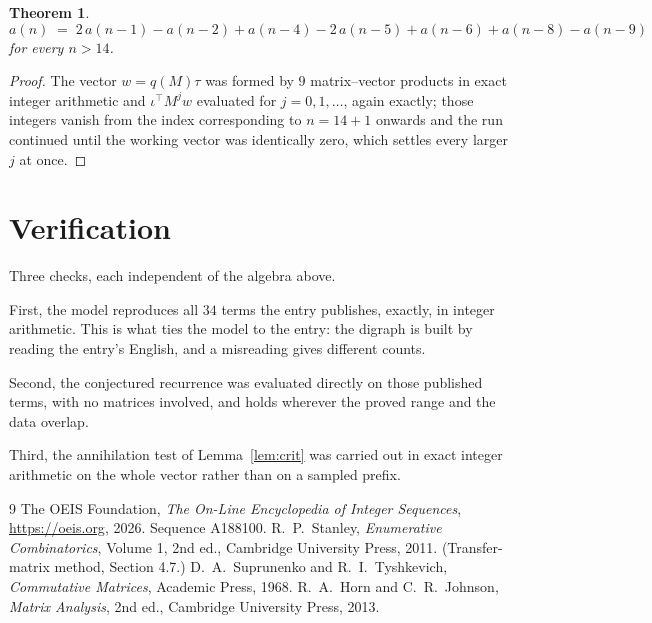 \documentclass[11pt,a4paper]{article}
\theoremstyle{plain}
\newtheorem{theorem}{Theorem}
\theoremstyle{definition}
\begin{document}
\begin{theorem}
\[
a(n)\;=\;2\,a(n-1) - a(n-2) + a(n-4) - 2\,a(n-5) + a(n-6) + a(n-8) - a(n-9)
\]
for every $n>14$.
\end{theorem}

\begin{proof}
The vector $w=q(M)\tau$ was formed by $9$ matrix--vector products in exact integer
arithmetic and $\iota^{\!\top}M^{j}w$ evaluated for $j=0,1,\dots$, again exactly; those
integers vanish from the index corresponding to $n=14+1$ onwards and the run continued
until the working vector was identically zero, which settles every larger $j$ at once.
\end{proof}

\section{Verification}

Three checks, each independent of the algebra above.

First, the model reproduces all $34$ terms the entry publishes, exactly, in integer
arithmetic. This is what ties the model to the entry: the digraph is built by reading the
entry's English, and a misreading gives different counts.

Second, the conjectured recurrence was evaluated directly on those published terms, with no
matrices involved, and holds wherever the proved range and the data overlap.

Third, the annihilation test of Lemma~\ref{lem:crit} was carried out in exact integer
arithmetic on the whole vector rather than on a sampled prefix.

\begin{thebibliography}{9}
 The OEIS Foundation, \emph{The On-Line Encyclopedia of Integer
Sequences}, \url{https://oeis.org}, 2026. Sequence A188100.
 R.~P.~Stanley, \emph{Enumerative Combinatorics}, Volume 1, 2nd ed.,
Cambridge University Press, 2011. (Transfer-matrix method, Section 4.7.)
 D.~A.~Suprunenko and R.~I.~Tyshkevich, \emph{Commutative Matrices},
Academic Press, 1968.
 R.~A.~Horn and C.~R.~Johnson, \emph{Matrix Analysis}, 2nd ed., Cambridge
University Press, 2013.
\end{thebibliography}
\end{document}
